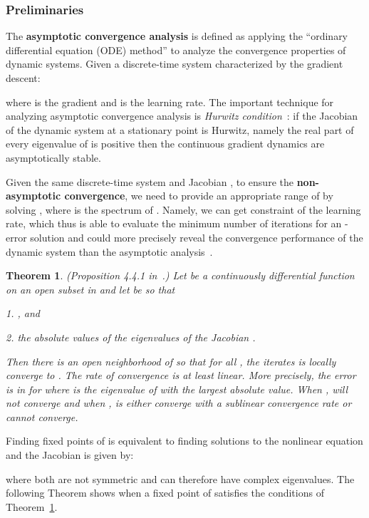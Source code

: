 \documentclass{article} \usepackage{iclr2023_conference,times}
\newtheorem{theo}{Theorem}
\begin{document}
\subsubsection{Preliminaries}
The \textbf{asymptotic convergence analysis} is defined as applying the “ordinary differential equation (ODE) method” to analyze the convergence properties of dynamic systems. Given a discrete-time system characterized by the gradient descent:

where  is the gradient and  is the learning rate. The important technique for analyzing asymptotic convergence analysis is \textit{Hurwitz condition}~\citep{nonlinearsystem}: if the Jacobian of the dynamic system  at a stationary point  is Hurwitz, namely the real part of every eigenvalue of  is positive then the continuous gradient dynamics are asymptotically stable.

Given the same discrete-time system and Jacobian , to ensure the \textbf{non-asymptotic convergence}, we need to provide an appropriate range of  by solving , where  is the spectrum of . Namely, we can get constraint of the learning rate, which thus is able to evaluate the minimum number of iterations for an -error solution and could more precisely reveal the convergence performance of the dynamic system than the asymptotic analysis~\citep{nie2020towards}. 

\begin{theo}
(Proposition 4.4.1 in~\citep{nonlinear2002dim}.) Let  be a continuously differential function on an open subset  in  and let  be so that 

1. , and 

2. the absolute values of the eigenvalues of the Jacobian . 

Then there is an open neighborhood  of  so that for all , the iterates  is locally converge to . The rate of convergence is at least linear. More precisely, the error  is in  for  where  is the eigenvalue of  with the largest absolute value. When ,  will not converge and when ,  is either converge with a sublinear convergence rate or cannot converge.
\label{theo:convergence}
\end{theo}

Finding fixed points of  is equivalent to finding solutions to the nonlinear equation  and the Jacobian is given by:

where both  are not symmetric and can therefore have complex eigenvalues. The following Theorem shows when a fixed point of  satisfies the conditions of Theorem~\ref{theo:convergence}.
\end{document}
